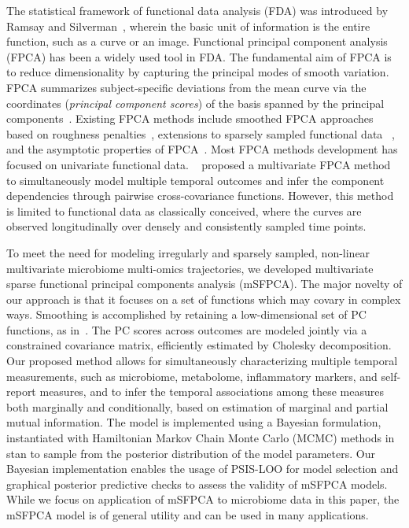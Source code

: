 \documentclass[aoas,preprint]{imsart}
\begin{document}
The statistical framework of functional data analysis (FDA) was introduced by Ramsay and Silverman~\citep{ramsay1997functional}, wherein the basic unit of information is the entire function, such as a curve or an image. Functional principal component analysis (FPCA) has been a widely used tool in FDA. The fundamental aim of FPCA is to reduce dimensionality by capturing the principal modes of smooth variation. FPCA summarizes subject-specific deviations from the mean curve via the coordinates ({\it principal component scores}) of the basis spanned by the principal components~\citep{di2009multilevel}. Existing FPCA methods include smoothed FPCA approaches based on roughness penalties~\citep{rice1991estimating}, extensions to sparsely sampled functional data ~\citep{james2000principal, yao2005functional, peng2009geometric, di2014multilevel, kidzinski2018longitudinal}, and the asymptotic properties of FPCA~\citep{hall2006properties, li2010uniform}. Most FPCA methods development has focused on univariate functional data. ~\citet{chiou2014multivariate} proposed a multivariate FPCA method to simultaneously model multiple temporal outcomes and infer the component dependencies through pairwise cross-covariance functions. However, this method is limited to functional data as classically conceived, where the curves are observed longitudinally over densely and consistently sampled time points. 

To meet the need for modeling irregularly and sparsely sampled, non-linear  multivariate microbiome multi-omics trajectories, we developed multivariate sparse functional principal components analysis (mSFPCA). The major novelty of our approach is that it focuses on a set of functions which may covary in complex ways. Smoothing is accomplished by retaining a low-dimensional set of  PC functions, as in~\citet{james2000principal}. The PC scores across outcomes are modeled jointly via a constrained covariance matrix, efficiently estimated by Cholesky decomposition. Our proposed method allows for simultaneously characterizing multiple temporal measurements, such as microbiome, metabolome, inflammatory markers, and  self-report measures, and to infer the temporal associations among these measures both marginally and conditionally, based on estimation of marginal and partial mutual information. The model is implemented using a Bayesian formulation, instantiated with Hamiltonian Markov Chain Monte Carlo (MCMC) methods in \textsf{stan} to sample from the posterior distribution of the model parameters. Our Bayesian implementation enables the usage of PSIS-LOO for model selection and graphical posterior predictive checks to assess the validity of mSFPCA models. While we focus on application of mSFPCA to microbiome data in this paper, the mSFPCA model is of general utility and can be used in many applications.
\end{document}
